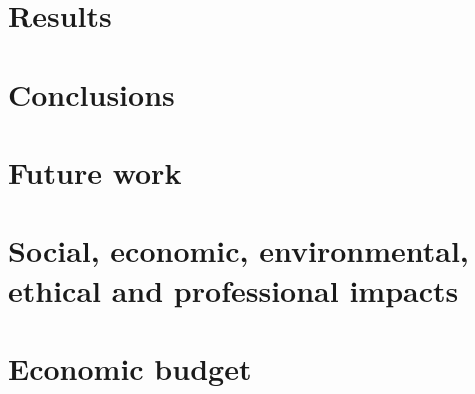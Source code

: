 \documentclass{etsit-report}
\begin{document}
\chapter{Results}
\label{chap:results}


\chapter{Conclusions}
\label{chap:conclusions}


\chapter{Future work}
\label{chap:future}


\printbibliography

\appendix

\chapter{Social, economic, environmental, ethical and professional impacts}
\label{app:impacts}


\chapter{Economic budget}
\label{app:budget}

\end{document}
